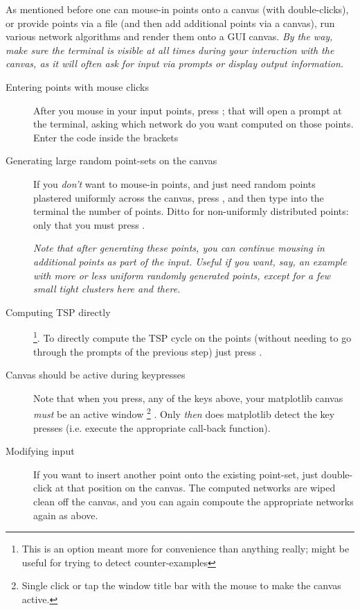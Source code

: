 \begin{appendices}
As mentioned before one can mouse-in points onto a canvas (with double-clicks), or provide points via a file (and then add additional points via a canvas), 
run various network algorithms and render them onto a GUI canvas. \textit{\footnotesize By the way, make sure the terminal is visible at all times during your 
interaction with the canvas, as it will often ask for input via prompts or display output information.}


\begin{description}
\item[Entering points with mouse clicks] After you  mouse in your input points, press ; that will open a prompt at the terminal, asking which 
network do  you want computed on those points. Enter the code inside the brackets  

\item[Generating large random point-sets on the canvas] If you \textit{don't} want to mouse-in points, and just need random points plastered uniformly across the canvas, 
press , and then type into the terminal the number of points. Ditto for non-uniformly distributed points: 
only that you must press . 

  \textit{Note that after generating these points, you can continue mousing in additional points as part of the input. Useful 
  if you want, say, an example with more or less uniform randomly generated points, except for a few small tight clusters here and there. }

\item[Computing TSP directly] \footnote{This is an option meant more for convenience than anything really; might be useful for trying to detect counter-examples}.   
To directly compute the TSP cycle on the points (without needing to go through the prompts of the previous step) just press . 

\item[Canvas should be active during keypresses] Note that when you press, any of the keys above, your matplotlib canvas \textit{must} be an active window 
\footnote{Single click or tap the window title bar with the mouse to make the canvas active.} . Only \textit{then} 
does matplotlib detect the key presses (i.e. execute the appropriate call-back function).  

\item[Modifying input] If you want to insert another point onto the existing point-set, just double-click at that position on the canvas. 
The computed networks are wiped clean off the canvas, and you can again compoute the appropriate networks again as above. 


\end{description}
\end{appendices}
